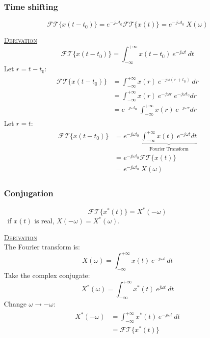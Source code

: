 \documentclass[12pt,a4paper]{article}
\begin{document}
\subsubsection{Time shifting}
\[ \mathcal{FT} \{ x(t-t_{0}) \} = e^{-j \omega t_{0}}\mathcal{FT} \{ x(t)\} = e^{-j \omega t_{0}} \ X(\omega) \]
\begin{tcolorbox}[breakable]
\underline{\textsc{Derivation}}\\
\[ \mathcal{FT} \{ x(t-t_{0}) \} =  \int_{-\infty}^{+\infty} x(t-t_{0}) \ e^{-j \omega t} \ dt\] 
Let $r = t - t_{0}$:
\begin{align*}\begin{split}
 \mathcal{FT} \{ x(t-t_{0}) \} &=  \int_{-\infty}^{+\infty} x(r) \ e^{-j \omega (r+t_{0})} \ dr\\
 &= \int_{-\infty}^{+\infty} x(r) \ e^{-j \omega r} \ e^{-j \omega t_{0}} dr \\
 &= e^{-j \omega t_{0}} \ \int_{-\infty}^{+\infty} x(r) \ e^{-j \omega r}dr 
\end{split} \end{align*}
Let $r = t$:
\begin{align*}\begin{split}
\mathcal{FT} \{ x(t-t_{0}) \} &= e^{-j \omega t_{0}} \ \underbrace{\int_{-\infty}^{+\infty} x(t) \ e^{-j \omega t} dt}_{\text{Fourier Transform}}\\
& = e^{-j \omega t_{0}}\mathcal{FT} \{ x(t)\}\\
&=e^{-j \omega t_{0}} \ X(\omega)
 \end{split} \end{align*}
\end{tcolorbox}

\subsubsection{Conjugation}
\[ \mathcal{FT} \{ x^{*}(t)\} = X^{*}(-\omega) \]
\ if $x(t)$ is real, $X(-\omega) = X^{*}(\omega)$.
\begin{tcolorbox}[breakable]
\underline{\textsc{Derivation}}\\
The Fourier transform is:
\[ X(\omega) =  \int_{-\infty}^{+\infty} x(t) \ e^{-j \omega t} \ dt\] 
Take the complex conjugate:
\[ X^{*}(\omega) =  \int_{-\infty}^{+\infty} x^{*}(t) \ e^{j \omega t} \ dt\] 
Change $\omega \to -\omega$:
\begin{align*}\begin{split} 
X^{*}(-\omega) &=  \int_{-\infty}^{+\infty} x^{*}(t) \ e^{-j \omega t} \ dt\\
&= \mathcal{FT}\{ x^{*}(t)\}
\end{split} \end{align*}\end{tcolorbox}
\end{document}
